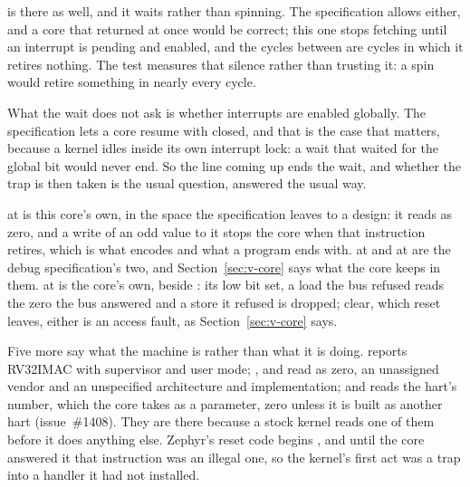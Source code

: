 \documentclass[journal,onecolumn,9pt]{IEEEtran}
\begin{document}
 is there as well, and it waits rather than spinning. The
specification allows either, and a core that returned at once would be
correct; this one stops fetching until an interrupt is pending and
enabled, and the cycles between are cycles in which it retires nothing.
The test measures that silence rather than trusting it: a spin would
retire something in nearly every cycle.

What the wait does not ask is whether interrupts are enabled globally.
The specification lets a core resume with  closed, and
that is the case that matters, because a kernel idles inside its own
interrupt lock: a wait that waited for the global bit would never end.
So the line coming up ends the wait, and whether the trap is then
taken is the usual question, answered the usual way.

 at  is this core's own, in the space the
specification leaves to a design: it reads as zero, and a write of an
odd value to it stops the core when that instruction retires, which
is what  encodes and what a program ends with.
 at  and  at  are the
debug specification's two, and Section~\ref{sec:v-core} says what
the core keeps in them.  at  is the
core's own, beside : its low bit set, a load the bus
refused reads the zero the bus answered and a store it refused is
dropped; clear, which reset leaves, either is an access fault, as
Section~\ref{sec:v-core} says.

Five more say what the machine is rather than what it is doing.
 reports RV32IMAC with supervisor and user mode;
,  and  read as zero, an
unassigned vendor and an unspecified architecture and implementation;
and  reads the hart's number, which the core takes as a
parameter, zero unless it is built as another hart (issue~\#1408).
They are there because a stock kernel reads one of them
before it does anything else. Zephyr's reset code begins
, and until the core answered it that
instruction was an illegal one, so the kernel's first act was a trap
into a handler it had not installed.
\end{document}
